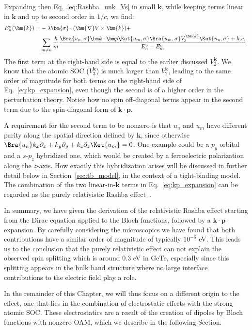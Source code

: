 Expanding then Eq.~\eqref{eq:Rashba_unk_Vs} in small $\bm{k}$, while keeping terms linear in $\bm{k}$ and up to second order in $1/c$, we find:
\begin{align}
	\label{eq:kp_expansion}
	E_n^{\sigma}(\bm{k}) =& -\lambda \bm{\sigma} \cdot ( \bm{\nabla}V \times \bm{k}) + \\
		& \sum_{m \neq n}\frac{\hbar}{m}\frac{\Bra{u_n,\sigma} \bm k \cdot \bm p \Ket{u_m, \sigma}\Bra{u_m, \sigma} V_3^{\bm{k}} \Ket{u_n, \sigma} + h.c.}{E_n^{\sigma} - E_m^{\sigma}}.\nonumber
\end{align}
The first term at the right-hand side is equal to the earlier discussed $V^{\bm k}_2$.
We know that the atomic \gls{SOC} ($V^{\bm k}_3$) is much larger than $V^{\bm{k}}_2$, leading to the same order of magnitude for both terms on the right-hand side of Eq.~\eqref{eq:kp_expansion}, even though the second is of a higher order in the perturbation theory. Notice how no spin off-diagonal terms appear in the second term due to the spin-diagonal form of $\bm k \cdot \bm p$.

A requirement for the second term to be nonzero is that $u_n$ and $u_m$ have different parity along the spatial direction defined by $\bm{k}$, since otherwise $\Bra{u_n} k_x \partial_x + k_y \partial_y + k_z \partial_z \Ket{u_m} = 0$.
One example could be a $p_y$ orbital and a $s$-$p_z$ hybridized one, which would be created by a ferroelectric polarization along the $z$-axis.
How exactly this hybridization arises will be discussed in further detail below in Section~\ref{sec:tb_model}, in the context of a tight-binding model.
The combination of the two linear-in-$\bm{k}$ terms in Eq.~\eqref{eq:kp_expansion} can be regarded as the purely relativistic Rashba effect~\cite{Bahramy2011}.
    
In summary, we have given the derivation of the relativistic Rashba effect starting from the Dirac equation applied to the Bloch functions, followed by a $\bm k \cdot \bm p$ expansion.
By carefully considering the microscopics we have found that both contributions have a similar order of magnitude of typically $10^{-6}$ eV.
This leads us to the conclusion that the purely relativistic effect can not explain the observed spin splitting which is around 0.3 eV in GeTe, especially since this splitting appears in the bulk band structure where no large interface contributions to the electric field play a role.

In the remainder of this Chapter, we will thus focus on a different origin to the effect, one that lies in the combination of electrostatic effects with the strong atomic \gls{SOC}.
These electrostatics are a result of the creation of dipoles by Bloch functions with nonzero \gls{OAM}, which we describe in the following Section. 
